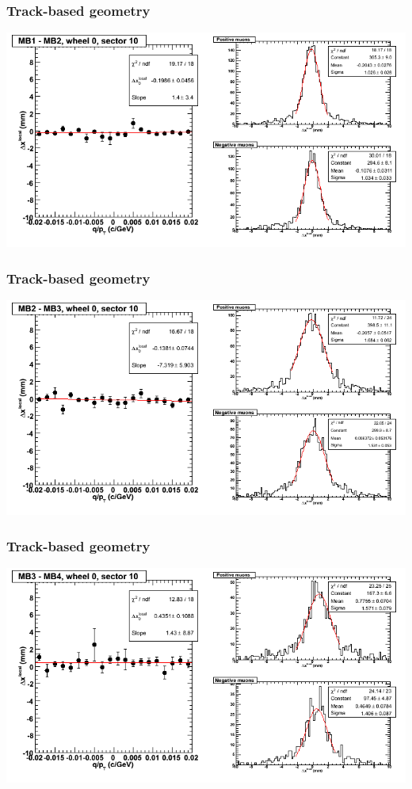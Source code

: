 \documentclass[compress]{beamer}
\begin{document}
\begin{frame}
\frametitle{Track-based geometry}
\includegraphics[width=\linewidth]{NOV4_segdiffs/dt13_resid_C_10_12.png}
\end{frame}

\begin{frame}
\frametitle{Track-based geometry}
\includegraphics[width=\linewidth]{NOV4_segdiffs/dt13_resid_C_10_23.png}
\end{frame}

\begin{frame}
\frametitle{Track-based geometry}
\includegraphics[width=\linewidth]{NOV4_segdiffs/dt13_resid_C_10_34.png}
\end{frame}
\end{document}
